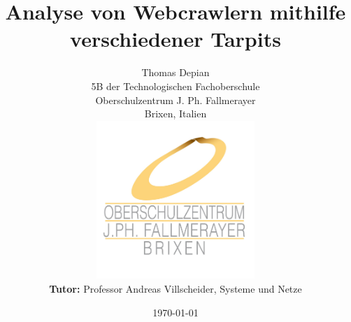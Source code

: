 \title{Analyse von Webcrawlern mithilfe verschiedener Tarpits}
\author{
  Thomas Depian\\
  5B der Technologischen Fachoberschule\\
  Oberschulzentrum J. Ph. Fallmerayer\\
  Brixen, Italien\\
  \includegraphics[width=6cm]{img/logo}
  \\
  \textbf{Tutor:} Professor Andreas Villscheider, Systeme und Netze
}
\date{\today}
\maketitle